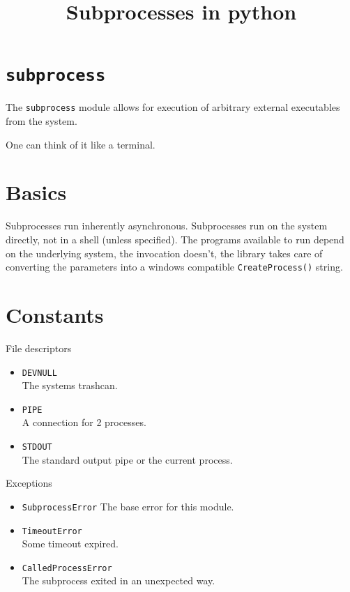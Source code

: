 \documentclass[ignorenonframetext,]{beamer}
\title{Subprocesses in python}
\date{}
\providecommand{\tightlist}{%
  \setlength{\itemsep}{0pt}\setlength{\parskip}{0pt}}
\begin{document}
\frame{\titlepage}

\section{\texorpdfstring{\texttt{subprocess}}{subprocess}}\label{subprocess}

\begin{frame}

The \texttt{subprocess} module allows for execution of arbitrary
external executables from the system.

One can think of it like a terminal.

\end{frame}

\section{Basics}\label{basics}

\begin{frame}

Subprocesses run inherently asynchronous. Subprocesses run on the system
directly, not in a shell (unless specified). The programs available to
run depend on the underlying system, the invocation doesn't, the library
takes care of converting the parameters into a windows compatible
\texttt{CreateProcess()} string.

\end{frame}

\section{Constants}\label{constants}

\begin{frame}{File descriptors}

\begin{itemize}
\tightlist
\item
  \texttt{DEVNULL}\\
  The systems trashcan.
\item
  \texttt{PIPE}\\
  A connection for 2 processes.
\item
  \texttt{STDOUT}\\
  The standard output pipe or the current process.
\end{itemize}

\end{frame}

\begin{frame}{Exceptions}

\begin{itemize}
\tightlist
\item
  \texttt{SubprocessError} The base error for this module.
\item
  \texttt{TimeoutError}\\
  Some timeout expired.
\item
  \texttt{CalledProcessError}\\
  The subprocess exited in an unexpected way.
\end{itemize}

\end{frame}
\end{document}
